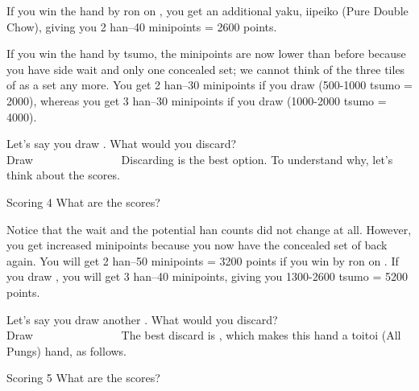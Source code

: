 \bigskip
\noindent If you win the hand by {\jap ron} on {\LARGE{}}, you get an additional {\jap yaku}, {\jap iipeiko} (Pure Double Chow), giving you 2 {\jap han}--40 minipoints = 2600 points. 

\bigskip
If you win the hand by {\jap tsumo}, the minipoints are now lower than before because you have side wait and only one concealed set; we cannot think of the three tiles of {\LARGE{}} as a set any more. You get 2 {\jap han}--30 minipoints if you draw {\LARGE{}} (500-1000 {\jap tsumo} = 2000), whereas you get 3 {\jap han}--30 minipoints if you draw {\LARGE{}} (1000-2000 {\jap tsumo} = 4000).

\bigskip

Let's say you draw {\LARGE{}}. What would you discard? 
\bp
{}\zhong\zhong\zhong~\\
\hfill\footnotesize{Draw~~~~~~~~~~~~~~~}
\ep
Discarding {\LARGE{}} is the best option. To understand why, let's think about the scores. 

\begin{itembox}[r]{Scoring 4}
\bp
{}\zhong\zhong\zhong
\ep
\vspace{-10pt} What are the scores?
\end{itembox}

\bigskip
\noindent Notice that the wait and the potential {\jap han} counts did not change at all. However, you get increased minipoints because you now have the concealed set of {\LARGE{}} back again. You will get 2 {\jap han}--50 minipoints = 3200 points if you win by {\jap ron} on {\LARGE{}}. If you draw {\LARGE{}}, you will get 3 {\jap han}--40 minipoints, giving you 1300-2600 {\jap tsumo} = 5200 points. 

\bigskip

Let's say you draw another {\LARGE{}}. What would you discard? 
\bp
{}\zhong\zhong\zhong~\\
\hfill\footnotesize{Draw~~~~~~~~~~~~~~~}
\ep
The best discard is {\LARGE{}}, which makes this hand a {\jap toitoi} (All Pungs) hand, as follows.

\begin{itembox}[r]{Scoring 5}
\bp
{}\zhong\zhong\zhong
\ep
\vspace{-10pt} What are the scores?
\end{itembox}

